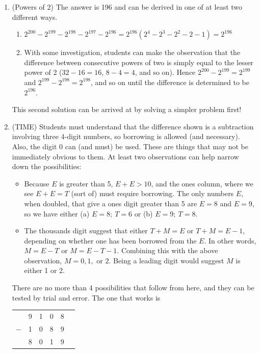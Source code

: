 {\begin{enumerate}
		\item (Powers of 2) The answer is 196 and can be derived in one of at least two different ways.
		\begin{enumerate}
			\item $2^{200}-2^{199}-2^{198}-2^{197}-2^{196}=2^{196}(2^4-2^3-2^2-2-1)=2^{196}$
			\item With some investigation, students can make the observation that the difference between consecutive powers of two is simply equal to the lesser power of 2 ($32-16=16$, $8-4=4$, and so on). Hence $2^{200}-2^{199}=2^{199}$ and $2^{199}-2^{198}=2^{198}$, and so on until the difference is determined to be $2^{196}$.
		\end{enumerate}
		This second solution can be arrived at by solving a simpler problem first!
		
		\item (TIME) Students must understand that the difference shown is a subtraction involving three 4-digit numbers, so borrowing is allowed (and necessary). Also, the digit 0 can (and must) be used. These are things that may not be immediately obvious to them. At least two observations can help narrow down the possibilities:
		\begin{itemize}
			\item Because $E$ is greater than 5, $E+E>10$, and the ones column, where we see $E+E=T$ (sort of) must require borrowing. The only numbers $E$, when doubled, that give a ones digit greater than 5 are $E=8$ and $E=9$, so we have either (a) $E=8;\ T=6$ or (b) $E=9;\ T=8$.
			\item The thousands digit suggest that either $T+M=E$ or $T+M=E-1$, depending on whether one has been borrowed from the $E$. In other words, $M=E-T$ or $M=E-T-1$. Combining this with the above observation, $M=0,1,\textrm{ or } 2$. Being a leading digit would suggest $M$ is either 1 or 2.
		\end{itemize}
		There are no more than 4 possibilities that follow from here, and they can be tested by trial and error. The one that works is
		\begin{center}
			\begin{tabular}{cccccc}
					& 9 & 1 & 0 & 8 & \tabularnewline
				$-$ & 1 & 0 & 8 & 9 & \tabularnewline
				\hline 
					& 8 & 0 & 1 & 9 & \tabularnewline
			\end{tabular}\par
		\end{center}
		

\end{enumerate}}
